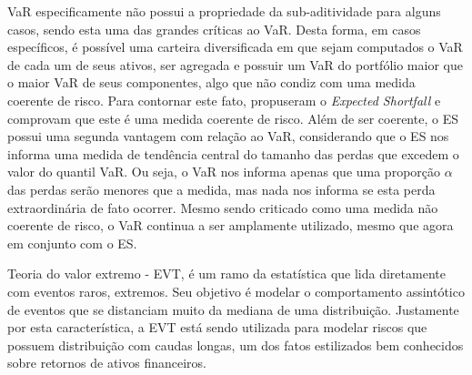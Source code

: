 \documentclass[1p]{elsarticle}
\theoremstyle{definition}
\begin{document}
VaR especificamente não possui a propriedade da sub-aditividade para alguns casos, sendo esta uma das grandes críticas ao VaR. Desta forma, em casos específicos, é possível uma carteira diversificada em que sejam computados o VaR de cada um de seus ativos, ser agregada e possuir um VaR do portfólio maior que o maior VaR de seus componentes, algo que não condiz com uma medida coerente de risco. Para contornar este fato, \cite{Acerbi2002} propuseram o \emph{Expected Shortfall} e comprovam que este é uma medida coerente de risco. Além de ser coerente, o ES possui uma segunda vantagem com relação ao VaR, considerando que o ES nos informa uma medida de tendência central do tamanho das perdas que excedem o valor do quantil VaR. Ou seja, o VaR nos informa apenas que uma proporção $\alpha$ das perdas serão menores que a medida, mas nada nos informa se esta perda extraordinária de fato ocorrer. Mesmo sendo criticado como uma medida não coerente de risco, o VaR continua a ser amplamente utilizado, mesmo que agora em conjunto com o ES. 



Teoria do valor extremo - EVT, é um ramo da estatística que lida diretamente com eventos raros, extremos. Seu objetivo é modelar o comportamento assintótico de eventos que se distanciam muito da mediana de uma distribuição. Justamente por esta característica, a EVT está sendo utilizada para modelar riscos que possuem distribuição com caudas longas, um dos fatos estilizados bem conhecidos sobre retornos de ativos financeiros.
\end{document}

